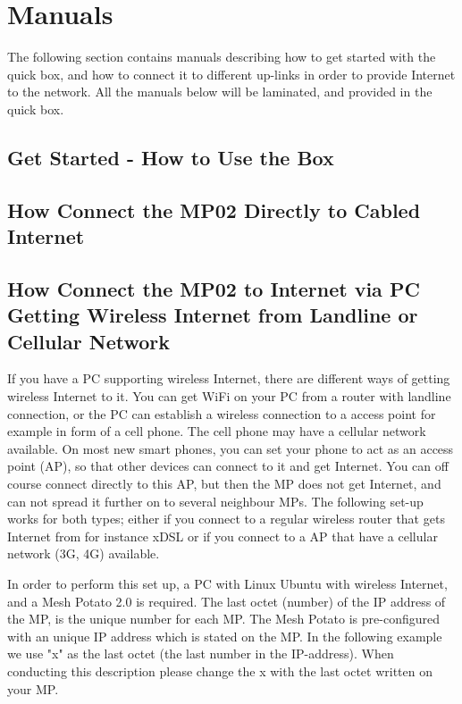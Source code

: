 \section{Manuals}
The following section contains manuals describing how to get started with the \gls{quick} box, and how to connect it to different up-links in order to provide Internet to the network. All the manuals below will be laminated, and provided in the \gls{quick} box. 
\clearpage
\subsection{Get Started - How to Use the Box}

\clearpage
\subsection{How Connect the MP02 Directly to Cabled Internet}
\label{subsec:cabledInternet}

\clearpage
\subsection{How Connect the MP02 to Internet via PC Getting Wireless Internet from Landline or Cellular Network}
\label{subsec:internetviaPC}

If you have a PC supporting wireless Internet, there are different ways of getting wireless Internet to it. You can get WiFi on your PC from a router with landline connection, or the PC can establish a wireless connection to a access point for example in form of a cell phone. The cell phone may have a cellular network available. On most new smart phones, you can set your phone to act as an access point (AP), so that other devices can connect to it and get Internet. You can off course connect directly to this AP, but then the MP does not get Internet, and can not spread it further on to several neighbour MPs. The following set-up works for both types; either if you connect to a regular wireless router that gets Internet from for instance xDSL or if you connect to a AP that have a cellular network (3G, 4G) available. 

In order to perform this set up, a PC with Linux Ubuntu with wireless Internet, and a Mesh Potato 2.0 is required. The last octet (number) of the IP address of the MP, is the unique number for each MP. The Mesh Potato is pre-configured with an unique IP address which is stated on the MP. In the following example we use "x" as the last octet (the last number in the IP-address). When conducting this description please change the x with the last octet written on your MP.

